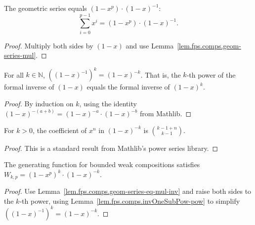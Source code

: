 \begin{lemma}
\label{lem.fps.comps.geom-series-eq-mul-inv}
\leanhelper
\leanok
The geometric series equals $(1 - x^p) \cdot (1-x)^{-1}$:
\[
\sum_{i=0}^{p-1} x^i = (1 - x^p) \cdot (1-x)^{-1}.
\]
\end{lemma}

\begin{proof}
\leanok
Multiply both sides by $(1 - x)$ and use Lemma~\ref{lem.fps.comps.geom-series-mul}.
\end{proof}

\begin{lemma}
\label{lem.fps.comps.invOneSubPow-pow}
\leanhelper
\leanok
For all $k \in \mathbb{N}$,
$\left((1 - x)^{-1}\right)^k = (1 - x)^{-k}$.
That is, the $k$-th power of the formal inverse of $(1 - x)$ equals
the formal inverse of $(1 - x)^k$.
\end{lemma}

\begin{proof}
\leanok
By induction on $k$, using the identity $(1-x)^{-(a+b)} = (1-x)^{-a} \cdot (1-x)^{-b}$
from Mathlib.
\end{proof}

\begin{lemma}
\label{lem.fps.comps.coeff-invOneSubPow}
\leanhelper
\leanok
For $k > 0$, the coefficient of $x^n$ in $(1-x)^{-k}$ is
$\binom{k - 1 + n}{k - 1}$.
\end{lemma}

\begin{proof}
\leanok
This is a standard result from Mathlib's power series library.
\end{proof}

\begin{lemma}
\label{lem.fps.comps.genFun-eq}
\leanhelper
\leanok
The generating function for bounded weak compositions satisfies
$W_{k,p} = (1-x^p)^k \cdot (1-x)^{-k}$.
\end{lemma}

\begin{proof}
\leanok
Use Lemma~\ref{lem.fps.comps.geom-series-eq-mul-inv} and raise both sides to the $k$-th power,
using Lemma~\ref{lem.fps.comps.invOneSubPow-pow} to simplify
$\left((1-x)^{-1}\right)^k = (1-x)^{-k}$.
\end{proof}

